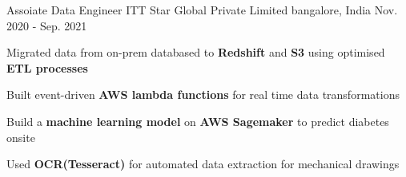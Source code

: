 \begin{cventries}
  \cventry
  {Assoiate Data Engineer} %
  {\fontsize{10pt}{1em}\bodyfont\upshape\color{futurepurple} ITT Star Global Private Limited} %
  {bangalore, India} %
  {Nov. 2020 - Sep. 2021} %
  {
    \begin{cvitems} %
    \item {Migrated data from on-prem databased to \textbf{Redshift} and \textbf{S3} using optimised \textbf{ETL processes}}
    \item {Built event-driven \textbf{AWS lambda functions} for real time data transformations}
    \item {Build a \textbf{machine learning model} on \textbf{AWS Sagemaker} to predict diabetes onsite}
    \item {Used \textbf{OCR(Tesseract)} for automated data extraction for mechanical drawings}
    \end{cvitems}
  }




\end{cventries}
